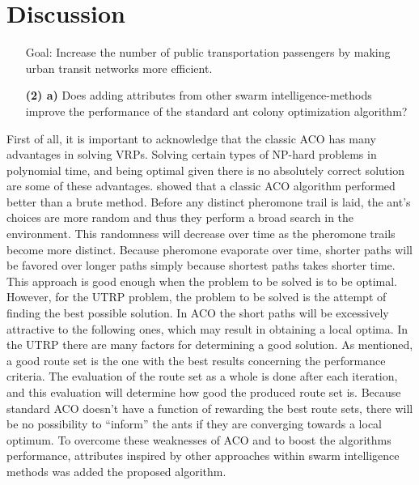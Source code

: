 \section{Discussion}
\begin{itemize}
\item[Goal:]  Increase the number of public transportation passengers by making urban transit networks more efficient.
\end{itemize}

\begin{itemize}
\item[\textbf{(2) a)}] Does adding attributes from other swarm intelligence-methods improve the performance of the standard ant colony optimization algorithm?
\end{itemize}

First of all, it is important to acknowledge that the classic ACO has many advantages in solving VRPs. Solving certain types of NP-hard problems in polynomial time, and being optimal given there is no absolutely correct solution are some of these advantages. \citet{hsiao04} showed that a classic ACO algorithm performed better than a brute method. Before any distinct pheromone trail is laid, the ant's choices are more random and thus they perform a broad search in the environment. This randomness will decrease over time as the pheromone trails become more distinct. Because pheromone evaporate over time, shorter paths will be favored over longer paths simply because shortest paths takes shorter time. This approach is good enough when the problem to be solved is to be optimal. However, for the UTRP problem, the problem to be solved is the attempt of finding the best possible solution. In ACO the short paths will be excessively attractive to the following ones, which may result in obtaining a local optima. In the UTRP there are many factors for determining a good solution. As mentioned, a good route set is the one with the best results concerning the performance criteria. The evaluation of the route set as a whole is done after each iteration, and this evaluation will determine how good the produced route set is. Because standard ACO doesn't have a function of rewarding the best route sets, there will be no possibility to ``inform'' the ants if they are converging towards a local optimum. To overcome these weaknesses of ACO and to boost the algorithms performance, attributes inspired by other approaches within swarm intelligence methods was added the proposed algorithm. %


